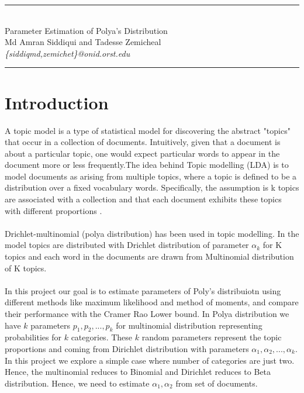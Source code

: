 \documentclass{article} %
\newcommand{\?}{\stackrel{?}{=}}
\newcommand{\horrule}[1]{\rule{\linewidth}{#1}} %
\begin{document}
\begin{center}
\horrule{0.5pt} \\[0.4cm] %
\LARGE Parameter Estimation of Polya's Distribution\\
\vspace{5pt}
\large Md Amran Siddiqui \normalsize and \large Tadesse Zemicheal\\
\small \it{\{siddiqmd,zemichet\}@onid.orst.edu}
\vspace{5pt}
\horrule{2pt} %
\end{center}



\section{Introduction} \label{INTRO}
A topic model is a type of statistical model for discovering the abstract "topics" that occur in a collection of documents. Intuitively, given that a document is about a particular topic, one would expect particular words to appear in the document more or less frequently.The idea behind Topic modelling (LDA) is to model documents as arising from multiple topics, where a topic is defined to be a distribution over a fixed vocabulary words. Specifically, the assumption is k topics are associated with a collection and that each document exhibits these topics with different proportions \cite{Blei02}.\\
\\
Drichlet-multinomial (polya distribution) has been used in topic modelling. In the model topics are distributed with Drichlet distribution of parameter $\alpha_k$ for K topics and each word in the documents are drawn from Multinomial distribution of K topics.\\
\\
In this project our goal is to estimate parameters of Poly's distribuiotn using different methods like maximum likelihood and method of moments, and compare their performance with the Cramer Rao Lower bound. In Polya distribution we have $k$ parameters $p_1, p_2, ..., p_k$ for multinomial distribution representing probabilities for $k$ categories. These $k$  random parameters represent the topic proportions and coming from Dirichlet distribution with parameters $\alpha_1, \alpha_2, ..., \alpha_k$. In this project we explore a simple case where number of categories are just two. Hence, the multinomial reduces to Binomial and Dirichlet reduces to Beta distribution. Hence, we need to estimate $\alpha_1, \alpha_2$ from set of documents.
\end{document}
